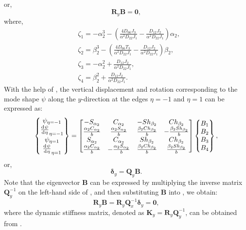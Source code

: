 \documentclass[preprint,12pt]{elsarticle}
\newcommand{\id}{\mathrm{d}\mkern1mu}
\begin{document}
%
or,
%
\begin{equation}\label{eq:ABy1}
	\mathbf{R}_y \mathbf{B} = \mathbf{0},
\end{equation}
%
where,
%
\begin{equation}\label{eq:gammay}
	\begin{split}
		&\zeta_1=-\alpha_2^3-\left( \frac{4D_{66}J_3}{\alpha^2D_{22}J_1}  - \frac{D_{12}J_2}{\alpha^2D_{22}J_1}  \right)\alpha_2,\\
		&\zeta_2=\beta_2^3-\left( \frac{4D_{66}T_3}{\alpha^2D_{22}J_1}  - \frac{D_{12}J_2}{\alpha^2D_{22}J_1}  \right)\beta_2,\\
		&\zeta_3=-\alpha_2^2+\frac{D_{12}J_2}{\alpha^2D_{22}J_1},\\
		&\zeta_4=\beta_2^2+\frac{D_{12}J_2}{\alpha^2D_{22}J_1}.
	\end{split}
\end{equation}
%
With the help of , the vertical displacement and rotation corresponding to the mode shape $\psi$ along the $y$-direction at the edges $\eta = -1$ and $\eta = 1$ can be expressed as:
%
\begin{equation}\label{eq:UBy}
	\begin{split}
		\begin{Bmatrix}
			\psi_{\eta=-1}\\\frac{\id \psi}{\id \eta}_{\eta=-1}\\\psi_{\eta=1}\\\frac{\id \psi}{\id \eta}_{\eta=1}
		\end{Bmatrix}
		= \begin{bmatrix}
			-S_{\alpha_2} & C_{\alpha_2} & -Sh_{\beta_2} & Ch_{\beta_2} \\
			\frac{\alpha_2 C_{\alpha_2}}{b} & \frac{\alpha_2 S_{\alpha_2}}{b} & \frac{\beta_2 Ch_{\beta_2}}{b} & -\frac{\beta_2 Sh_{\beta_2}}{b} \\
			S_{\alpha_2} & C_{\alpha_2} & Sh_{\beta_2} & Ch_{\beta_2} \\
			\frac{\alpha_2 C_{\alpha_2}}{b} & -\frac{\alpha_2 S_{\alpha_2}}{b} & \frac{\beta_2 Ch_{\beta_2}}{b} & \frac{\beta_2 Sh_{\beta_2}}{b}
		\end{bmatrix}
		\begin{Bmatrix}
			B_1\\B_2\\B_3\\B_4
		\end{Bmatrix},		
	\end{split}
\end{equation}
%
or,
%
\begin{equation}\label{eq:UBy1}
	\mathbf{\delta}_y= \mathbf{Q}_y\mathbf{B}.
\end{equation}
%
Note that the eigenvector $\mathbf{B}$ can be expressed by multiplying the inverse matrix $\mathbf{Q}_y^{-1}$ on the left-hand side of , and then substituting $\mathbf{B}$ into , we obtain:
%
\begin{equation}\label{eq:DSM_eqy}
	\mathbf{R}_y\mathbf{B}=\mathbf{R}_y \mathbf{Q}_x^{-1} 
	\mathbf{\delta}_y = \mathbf{0},
\end{equation}
%
where the dynamic stiffness matrix, denoted as $\mathbf{K}_y = \mathbf{R}_y \mathbf{Q}_y^{-1}$, can be obtained from .
\end{document}
